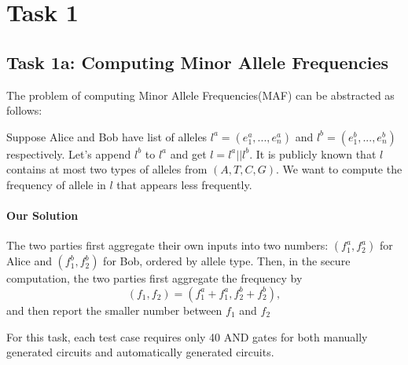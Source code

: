\section{Task 1}
\subsection*{Task 1a: Computing Minor Allele Frequencies}
The problem of computing Minor Allele Frequencies(MAF) can be abstracted as follows:

Suppose Alice and Bob have list of alleles $l^a = (e^a_1,...,e^a_n)$ and $l^b = (e^b_1,...,e^b_n)$ respectively.
Let's append $l^b$ to $l^a$ and get $l = l^a || l^b$. It is publicly known that $l$ contains at most two types of
alleles from $(A,T,C,G)$. We want to compute the frequency of allele in $l$ that appears less frequently.

\paragraph{Our Solution}
The two parties first aggregate their own inputs into two numbers: $(f^a_1, f^a_2)$ for Alice and $(f^b_1,f^b_2)$ for Bob, ordered by allele type.
Then, in the secure computation, the two parties first aggregate the frequency by
$$(f_1, f_2) = (f^a_1+f^a_1, f^b_2+f^b_2),$$
and then report the smaller number between $f_1$ and $f_2$

For this task, each test case requires only 40 AND gates for both manually generated circuits and automatically generated circuits.

